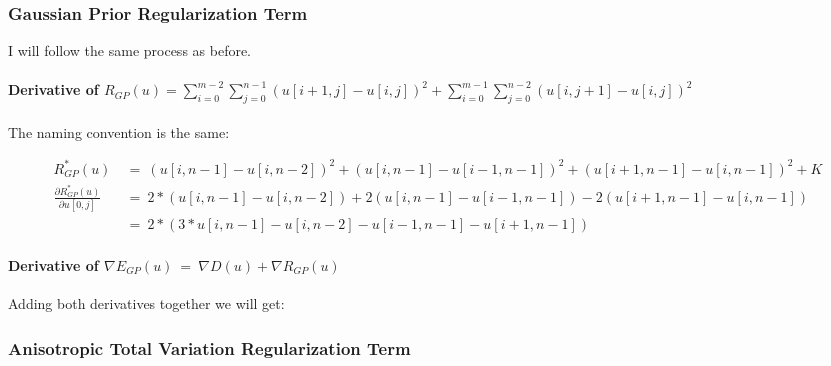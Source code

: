 \documentclass{report}
\begin{document}
			\subsubsection{Gaussian Prior Regularization Term}
			\startsubsection
				I will follow the same process as before.
				\vspace{-0.4cm} \paragraph{Derivative of $R_{GP}(u) = \sum_{i=0}^{m-2} \sum_{j=0}^{n-1} ( u[i+1,j] - u[i,j] )^2 + \sum_{i=0}^{m-1} \sum_{j=0}^{n-2} ( u[i,j+1] - u[i,j] )^2$}
				\startsubsection
					\vspace{0.2cm} The naming convention is the same:
				\closesection
				\begin{adjustwidth}{-4em}{}
					\vspace{-0.5cm}
					\begin{align*}
						R_{GP}^*(u) \ & = \ (u[i,n-1] - u[i,n-2])^2 + (u[i,n-1] - u[i-1,n-1])^2 + (u[i+1,n-1] - u[i,n-1])^2 + K \\
						\frac{\partial R_{GP}^*(u)}{\partial u[0,j]} \ & = \ 2 * (u[i,n-1] - u[i,n-2]) + 2 (u[i,n-1] - u[i-1,n-1]) - 2 (u[i+1,n-1] - u[i,n-1]) \\
						& = \ 2 * (3 * u[i,n-1] - u[i,n-2] - u[i-1,n-1] - u[i+1,n-1])
					\end{align*}
				\end{adjustwidth}
				\vspace{-0.4cm} \paragraph{Derivative of $\nabla E_{GP}(u) \ = \ \nabla D(u) + \nabla R_{GP}(u)$}
				\startsubsection
					Adding both derivatives together we will get:
				\closesection
			\closesection
			\subsubsection{Anisotropic Total Variation Regularization Term}
			\startsubsection
			\closesection
		\closesection
	\closesection
\end{document}
